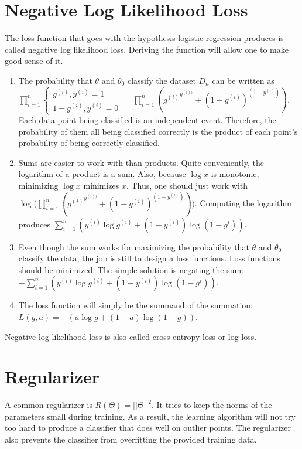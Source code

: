 \documentclass{article}
\begin{document}
    \section{Negative Log Likelihood Loss}
    The loss function that goes with the hypothesis logistic regression produces is called negative log likelihood loss. Deriving the function will allow one to make good sense of it. 
        \begin{enumerate}
            \item The probability that $\theta$ and $\theta_0$ classify the dataset $D_n$ can be written as $\prod^n_{i=1}{\begin{cases}
                g^{(i)}, y^{(i)}=1\\
                1-g^{(i)} , y^{(i)}=0
            \end{cases}}=\prod^n_{i=1}({{g^{(i)}}^{y^{(i))}}+(1-g^{(i)})^{(1-y^{(i)})}})$.
            Each data point being classified is an independent event. Therefore, the probability of them all being classified correctly is the product of each point's probability of being correctly classified. 

            \item Sums are easier to work with than products. Quite conveniently, the logarithm of a product is a sum. Also, because $\log{x}$ is monotonic, minimizing $\log{x}$ minimizes $x$. Thus, one should just work with $\log{(\prod^n_{i=1}({{g^{(i)}}^{y^{(i))}}+(1-g^{(i)})^{(1-y^{(i)})}})})$. Computing the logarithm produces $\sum^n_{i=1}({y^{(i)}\log{g^{(i)}}+(1-y^{(i)})\log{(1-g^{i})}})$. 

            \item Even though the sum works for maximizing the probability that $\theta$ and $\theta_0$ classify the data, the job is still to design a loss functions. Loss functions should be minimized. The simple solution is negating the sum: $-\sum^n_{i=1}({y^{(i)}\log{g^{(i)}}+(1-y^{(i)})\log{(1-g^{i})}})$. 

            \item The loss function will simply be the summand of the summation: $L(g,a)=-(a\log{g}+(1-a)\log{(1-g)})$. 
            
        \end{enumerate}
    Negative log likelihood loss is also called cross entropy loss or log loss. \\

    \section{Regularizer}
    A common regularizer is $R(\Theta)=||\Theta||^2$. It tries to keep the norms of the parameters small during training. As a result, the learning algorithm will not try too hard to produce a classifier that does well on outlier points. The regularizer also prevents the classifier from overfitting the provided training data. 
\end{document}
